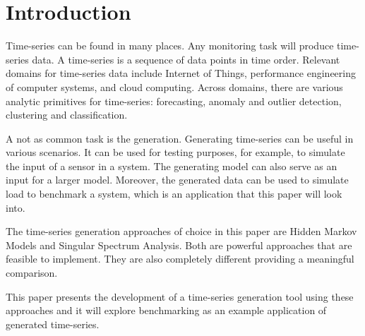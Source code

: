 
\chapter{Introduction}\label{chapter:introduction}

Time-series can be found in many places. Any monitoring task will produce time-series data.  A time-series is a sequence of data points in time order.  Relevant domains for time-series data include Internet of Things,  performance engineering of computer systems, and cloud computing. Across domains, there are various analytic primitives for time-series: forecasting, anomaly and outlier detection, clustering and classification.

A not as common task is the generation. Generating time-series can be useful in various scenarios. It can be used for testing purposes, for example, to simulate the input of a sensor in a system. The generating model can also serve as an input for a larger model. Moreover, the generated data can be used to simulate load to benchmark a system, which is an application that this paper will look into. 

The time-series generation approaches of choice in this paper are Hidden Markov Models and Singular Spectrum Analysis. Both are powerful approaches that are feasible to implement. They are also completely different providing a meaningful comparison. 

This paper presents the development of a time-series generation tool using these approaches and it will explore benchmarking as an example application of generated time-series. 